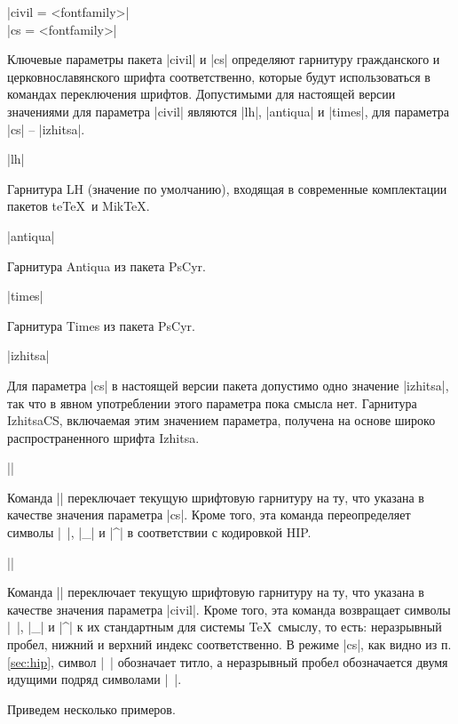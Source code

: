 \documentclass{ltxguide}
\begin{document}
\begin{decl}
|civil = <fontfamily>| \\
|cs    = <fontfamily>|
\end{decl}

Ключевые параметры пакета |civil| и |cs| определяют гарнитуру
гражданского и церковнославянского шрифта соответственно, которые будут
использоваться в командах переключения шрифтов. Допустимыми для настоящей
версии значениями для параметра |civil| являются |lh|, |antiqua| и |times|,
для параметра |cs| -- |izhitsa|.
\begin{decl}
|lh|
\end{decl}
Гарнитура LH (значение по умолчанию), входящая в современные комплектации пакетов te\TeX\
  и Mik\TeX.
\begin{decl}
|antiqua|
\end{decl}
Гарнитура Antiqua из пакета PsCyr.
\begin{decl}
|times|
\end{decl}
Гарнитура Times из пакета PsCyr.

\begin{decl}
|izhitsa|
\end{decl}
Для параметра |cs| в настоящей версии пакета допустимо одно значение
|izhitsa|, так что в явном употреблении этого параметра пока смысла
нет. Гарнитура IzhitsaCS, включаемая этим значением параметра,
получена на основе широко распространенного шрифта Izhitsa.

\begin{decl}
|\cs|
\end{decl}

Команда |\cs| переключает текущую шрифтовую гарнитуру на ту, что указана
в качестве значения параметра |cs|. Кроме того, эта команда переопределяет символы
|~|, |_| и |^| в соответствии с кодировкой HIP. 

\begin{decl}
|\civil|
\end{decl}

Команда |\civil| переключает текущую шрифтовую гарнитуру на ту, что указана в
качестве значения параметра |civil|. Кроме того, эта команда возвращает
символы |~|, |_| и |^| к их стандартным для системы \TeX\ смыслу, то есть:
неразрывный пробел, нижний и верхний индекс соответственно. В режиме |cs|,
как видно из п.\ref{sec:hip}, символ |~| обозначает титло, а неразрывный пробел
обозначается двумя идущими подряд символами |~|.

Приведем несколько примеров.
\end{document}
